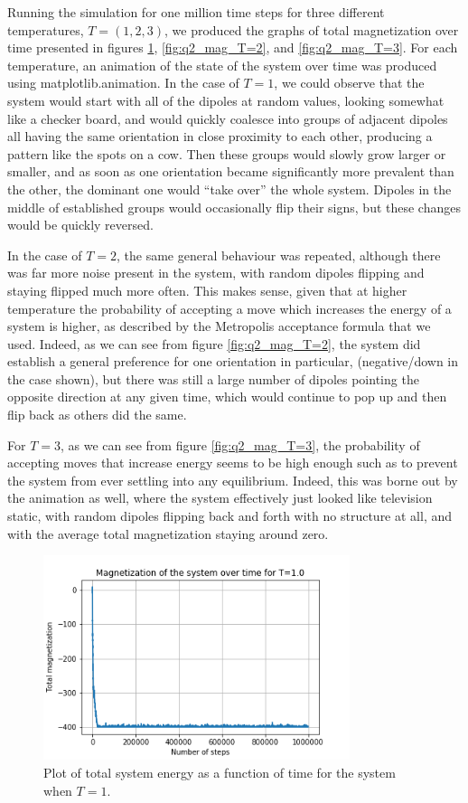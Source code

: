 \documentclass{article}
\begin{document}
Running the simulation for one million time steps for three different temperatures, $T=(1,2,3)$, we produced the graphs of total magnetization over time presented in figures \ref{fig:q2_mag_T=1}, \ref{fig:q2_mag_T=2}, and \ref{fig:q2_mag_T=3}. For each temperature, an animation of the state of the system over time was produced using matplotlib.animation. In the case of $T=1$, we could observe that the system would start with all of the dipoles at random values, looking somewhat like a checker board, and would quickly coalesce into groups of adjacent dipoles all having the same orientation in close proximity to each other, producing a pattern like the spots on a cow. Then these groups would slowly grow larger or smaller, and as soon as one orientation became significantly more prevalent than the other, the dominant one would ``take over'' the whole system. Dipoles in the middle of established groups would occasionally flip their signs, but these changes would be quickly reversed.

In the case of $T=2$, the same general behaviour was repeated, although there was far more noise present in the system, with random dipoles flipping and staying flipped much more often. This makes sense, given that at higher temperature the probability of accepting a move which increases the energy of a system is higher, as described by the Metropolis acceptance formula that we used. Indeed, as we can see from figure \ref{fig:q2_mag_T=2}, the system did establish a general preference for one orientation in particular, (negative/down in the case shown), but there was still a large number of dipoles pointing the opposite direction at any given time, which would continue to pop up and then flip back as others did the same.

For $T=3$, as we can see from figure \ref{fig:q2_mag_T=3}, the probability of accepting moves that increase energy seems to be high enough such as to prevent the system from ever settling into any equilibrium. Indeed, this was borne out by the animation as well, where the system effectively just looked like television static, with random dipoles flipping back and forth with no structure at all, and with the average total magnetization staying around zero.

\begin{figure}[H]
	\centering
	\includegraphics[width=0.8\textwidth]{../images/q2_magnetization_T=1.png}
	\caption{Plot of total system energy as a function of time for the system when $T=1$.}
	\label{fig:q2_mag_T=1}
\end{figure}
\end{document}
